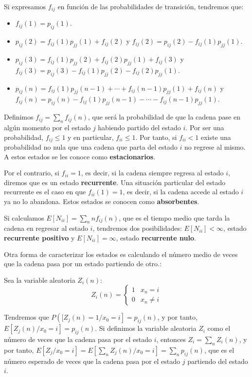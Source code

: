 Si expresamos $f_{ij}$ en funci\'on de las probabilidades de transici\'on, tendremos que:
\begin{itemize}
\item $f_{ij}(1)=p_{ij}(1)$.
\item $p_{ij}(2)=f_{ij}(1)p_{jj}(1)+f_{ij}(2)$ y $f_{ij}(2)=p_{ij}(2)-f_{ij}(1)p_{jj}(1)$.
\item $p_{ij}(3)=f_{ij}(1)p_{jj}(2)+f_{ij}(2)p_{jj}(1)+f_{ij}(3)$ y $f_{ij}(3)=p_{ij}(3)-f_{ij}(1)p_{jj}(2)-f_{ij}(2)p_{jj}(1)$.
\item $p_{ij}(n)=f_{ij}(1)p_{jj}(n-1)+\cdots+f_{ij}(n-1)p_{jj}(1)+f_{ij}(n)$ y $f_{ij}(n)=p_{ij}(n)-f_{ij}(1)p_{jj}(n-1)-\cdots-f_{ij}(n-1)p_{jj}(1)$.
\end{itemize}

Definimos $f_{ij}=\sum_nf_{ij}(n)$, que ser\'a la probabilidad de que la cadena pase en alg\'un momento por el estado $j$ habiendo partido del estado $i$. Por ser una probabilidad, $f_{ij}\leq 1$ y en particular, $f_{ii}\leq 1$. Por tanto, si  $f_{ii}< 1$ existe una probabilidad no nula que una cadena que parta del estado $i$ no regrese al mismo. A estos estados se les conoce como \textbf{estacionarios}.

Por el contrario, si $f_{ii}=1$, es decir, si la cadena siempre regresa al estado $i$, diremos que es un estado \textbf{recurrente}. Una situaci\'on particular del estado recurrente es el caso en que $f_{ii}(1)=1$, es decir, si la cadena accede al estado $i$ ya no lo abandona. Estos estados se conocen como \textbf{absorbentes}.

Si calculamos $E[N_{ii}]=\sum_nnf_{ij}(n)$, que es el tiempo medio que tarda la cadena en regresar al estado $i$, tendremos dos posibilidades: $E[N_{ii}]<\infty$, estado \textbf{recurrente positivo} y $E[N_{ii}]=\infty$, estado \textbf{recurrente nulo}.

Otra forma de caracterizar los estados es calculando el n\'umero medio de veces que la cadena pasa por un estado partiendo de otro.:

Sea la variable aleatoria $Z_i(n)$:
\begin{equation*}
Z_i(n)=\begin{cases}
1 & x_{n}=i\\
0 & x_{n}\neq i
\end{cases}
\end{equation*}

Tendremos que $P\left([Z_j(n)=1/x_0=i\right]=p_{ij}(n)$, y por tanto, $E\left[Z_j(n)/x_0=i\right]=p_{ij}(n)$. Si definimos la variable aleatoria $Z_i$ como el n\'umero de veces que la cadena pasa por el estado $i$, entonces $Z_i=\sum_nZ_i(n)$, y por tanto, $E\left[Z_j/x_0=i\right]=E\left[\sum_nZ_j(n)/x_0=i\right]=\sum_np_{ij}(n)$, que es el n\'umero esperado de veces que la cadena pasa por el estado $j$ partiendo del estado $i$.

